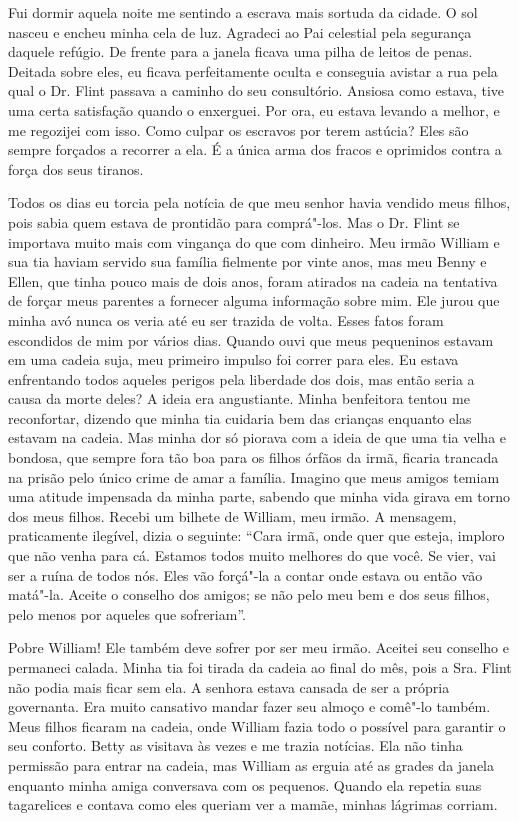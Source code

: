 Fui dormir aquela noite me sentindo a
escrava mais sortuda da cidade. O sol nasceu e encheu minha cela de luz.
Agradeci ao Pai celestial pela segurança daquele refúgio. De frente para
a janela ficava uma pilha de leitos de penas. Deitada sobre eles, eu
ficava perfeitamente oculta e conseguia avistar a rua pela qual o Dr.
Flint passava a caminho do seu consultório. Ansiosa como estava, tive
uma certa satisfação quando o enxerguei. Por ora, eu estava levando a
melhor, e me regozijei com isso. Como culpar os escravos por terem
astúcia? Eles são sempre forçados a recorrer a ela. É a única arma dos
fracos e oprimidos contra a força dos seus tiranos.

Todos os dias eu torcia pela notícia de
que meu senhor havia vendido meus filhos, pois sabia quem estava de
prontidão para comprá"-los. Mas o Dr. Flint se importava muito mais com
vingança do que com dinheiro. Meu irmão William e sua tia haviam servido
sua família fielmente por vinte anos, mas meu Benny e Ellen, que tinha
pouco mais de dois anos, foram atirados na cadeia na tentativa de forçar
meus parentes a fornecer alguma informação sobre mim. Ele jurou que
minha avó nunca os veria até eu ser trazida de volta. Esses fatos foram
escondidos de mim por vários dias. Quando ouvi que meus pequeninos
estavam em uma cadeia suja, meu primeiro impulso foi correr para eles.
Eu estava enfrentando todos aqueles perigos pela liberdade dos dois, mas
então seria a causa da morte deles? A ideia era angustiante. Minha
benfeitora tentou me reconfortar, dizendo que minha tia cuidaria bem das
crianças enquanto elas estavam na cadeia. Mas minha dor só piorava com a
ideia de que uma tia velha e bondosa, que sempre fora tão boa para os
filhos órfãos da irmã, ficaria trancada na prisão pelo único crime de
amar a família. Imagino que meus amigos temiam uma atitude impensada da
minha parte, sabendo que minha vida girava em torno dos meus filhos.
Recebi um bilhete de William, meu irmão. A mensagem, praticamente
ilegível, dizia o seguinte: ``Cara irmã, onde quer que esteja, imploro
que não venha para cá. Estamos todos muito melhores do que você. Se
vier, vai ser a ruína de todos nós. Eles vão forçá"-la a contar onde
estava ou então vão matá"-la. Aceite o conselho dos amigos; se não pelo
meu bem e dos seus filhos, pelo menos por aqueles que sofreriam''.

Pobre William! Ele também deve sofrer
por ser meu irmão. Aceitei seu conselho e permaneci calada. Minha tia
foi tirada da cadeia ao final do mês, pois a Sra. Flint não podia mais
ficar sem ela. A senhora estava cansada de ser a própria governanta. Era
muito cansativo mandar fazer seu almoço e comê"-lo também. Meus filhos
ficaram na cadeia, onde William fazia todo o possível para garantir o
seu conforto. Betty as visitava às vezes e me trazia notícias. Ela não
tinha permissão para entrar na cadeia, mas William as erguia até as
grades da janela enquanto minha amiga conversava com os pequenos. Quando
ela repetia suas tagarelices e contava como eles queriam ver a mamãe,
minhas lágrimas corriam.

